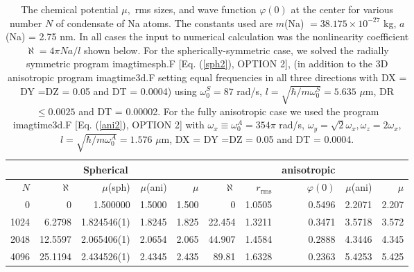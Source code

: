 \documentclass[onecolumn]{elsart3p}
\begin{document}
\begin{table}[!ht]
\begin{center}
\caption{The chemical potential $\mu,$ rms sizes, and wave function 
$\varphi(0)$ at the center  for various number $N$ of
condensate of Na
atoms. The constants used are $m$(Na) $= 38.175\times 10^{-27}$ kg,
$a$(Na)
 = 2.75 nm. In all cases the input to numerical calculation was the
nonlinearity
coefficient $\aleph %
=4\pi Na/l$ shown below.
For the
spherically-symmetric
case, we solved the radially symmetric program imagtimesph.F [Eq.
(\ref{sph2}), OPTION 2],
(in
addition to the 3D
anisotropic program imagtime3d.F
setting equal frequencies in all three directions
with DX = DY =DZ = 0.05 and DT = 0.0004)
using \cite{Schneider_Feder,hau}
$\omega_0^S=87$ rad/s,
$
l=\sqrt{\hbar/m\omega_0^S}= 5.635$   $\mu$m, DR $\le 0.0025$ and
DT = 0.00002.
For the fully
anisotropic case we used the program imagtime3d.F [Eq.
(\ref{ani2}), OPTION 2] with \cite{Schneider_Feder,kozuma}
$\omega_x\equiv \omega_0 ^A=354 \pi$ rad/s,
$\omega_y=\sqrt 2
\omega_x,
\omega_z=2\omega_x$, $l=\sqrt{\hbar/m\omega_0^A}=1.576$ $\mu$m,
DX = DY =DZ = 0.05 and DT = 0.0004.}
\label{table7}
\begin{tabular}{|r|r|r|r|r|r|r|r|r|r|}
\hline
   & \multicolumn{1}{c}{} &
\multicolumn{1}{c}{Spherical} &  \multicolumn{1}{c}{}&{}
& \multicolumn{1}{c}{}
& \multicolumn{1}{c}{}
&\multicolumn{1}{c}{anisotropic}
& \multicolumn{1}{c}{}
& {}
\\
\hline
$N $
& {$\aleph $}  %
& $\mu$(sph)&$\mu$(ani)  &$\mu $ 
\cite{Schneider_Feder}
& {$\aleph$}&$r_{\mathrm{rms}}$   &$\varphi(0)$&  $\mu$(ani) & $\mu $
\cite{Schneider_Feder} \\
\hline
0 &  0   &1.500000    & 1.5000 &1.500
& 0&1.0505 &0.5496 &
2.2071 &
2.207
\\
    1024 &  6.2798   &1.824546(1)& 1.8245   &  1.825 &
22.454&1.3211
&
0.3471& 3.5718&
3.572\\
    2048 &    12.5597 & 2.065406(1) & 2.0654 &2.065    &
44.907&
 1.4584
& 0.2888&
4.3446
&4.345 \\
    4096 &    25.1194 & 2.434526(1)  & 2.4345 &2.435  &
89.81
&1.6328
&0.2363 &5.4253
&5.425 \\

\end{tabular}
\end{center}
\end{table}
\end{document}
